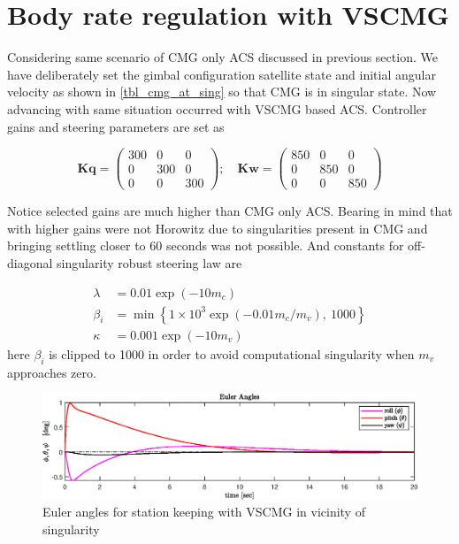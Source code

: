 \section{Body rate regulation with VSCMG}
Considering same scenario of CMG only ACS discussed in previous section. We have deliberately set the gimbal configuration satellite state and initial angular velocity as shown in \autoref{tbl_cmg_at_sing} so that CMG is in singular state. Now advancing with same situation occurred with VSCMG based ACS. Controller gains and steering parameters are set as

\begin{equation}
\mathbf{Kq} =\begin{pmatrix}
300 & 0 & 0\\
0 & 300 & 0\\
0 & 0 & 300
\end{pmatrix} ;\quad \mathbf{Kw} =\begin{pmatrix}
850 & 0 & 0\\
0 & 850 & 0\\
0 & 0 & 850
\end{pmatrix}
\end{equation}

\noindent Notice selected gains are much higher than CMG only ACS. Bearing in mind that with higher gains were not Horowitz due to singularities present in CMG and bringing settling closer to 60 seconds was not possible. 
\noindent And constants for off-diagonal singularity robust steering law are 

\begin{equation*}
\begin{aligned}
\lambda  & =0.01\exp( -10m_{c})\\
\beta _{i} & =\min\left\{1\times 10^{3}\exp( -0.01m_{c} /m_{v}) ,\ 1000\right\}\\
\kappa  & =0.001\exp( -10m_{v})
\end{aligned}
\end{equation*}
 here $\beta_i $ is clipped to 1000  in order to avoid computational singularity when $m_v$ approaches zero. \begin{figure}[H]
     \centering
    \includegraphics[width=0.9\columnwidth]{figures/plots/VSCMG/vs_reg_w10_ypr.eps}
    \caption{Euler angles for station keeping with VSCMG in vicinity of singularity}
    \label{plt:vs_reg_w10_ypr}
\end{figure}

